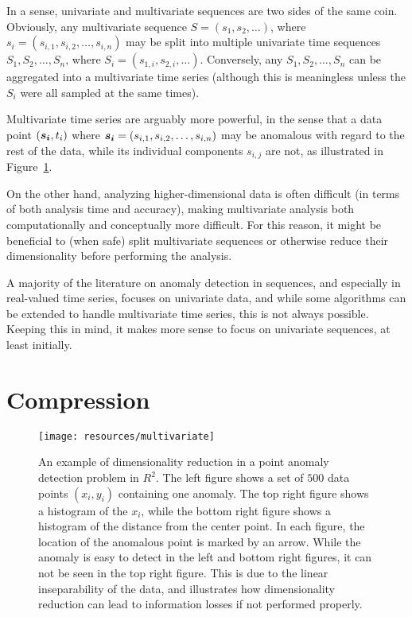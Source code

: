 In a sense, univariate and multivariate sequences are two sides of the same coin. Obviously, any multivariate sequence $S = (s_1, s_2, \dots)$, where $s_i = (s_{i,1}, s_{i,2}, \dots, s_{i,n})$ may be split into multiple univariate time sequences $S_1, S_2, \dots, S_n$, where $S_i = (s_{1,i}, s_{2, i}, \dots )$. Conversely, any $S_1, S_2, \dots, S_n$ can be aggregated into a multivariate time series (although this is meaningless unless the $S_i$ were all sampled at the same times).

Multivariate time series are arguably more powerful, in the sense that a data point $(\boldsymbol{s_i}, t_i)$ where $\boldsymbol{s_i} = (s_{i,1}, s_{i,2}, \dots, s_{i,n})$ may be anomalous with regard to the rest of the data, while its individual components $s_{i,j}$ are not, as illustrated in Figure~\ref{fig:dimensionality_reduction}.

On the other hand, analyzing higher-dimensional data is often difficult (in terms of both analysis time and accuracy), making multivariate analysis both computationally and conceptually more difficult. For this reason, it might be beneficial to (when safe) split multivariate sequences or otherwise reduce their dimensionality before performing the analysis.

A majority of the literature on anomaly detection in sequences, and especially in real-valued time series, focuses on univariate data, and while some algorithms can be extended to handle multivariate time series, this is not always possible. Keeping this in mind, it makes more sense to focus on univariate sequences, at least initially.

\section{Compression}
\label{sect:compression}

\begin{figure}[htb]
\begin{center}
\leavevmode
\texttt{[image: resources/multivariate]}
\end{center}
\caption{\small{An example of dimensionality reduction in a point anomaly detection problem in $R^2$. The left figure shows a set of $500$ data points $(x_i, y_i)$ containing one anomaly. The top right figure shows a histogram of the $x_i$, while the bottom right figure shows a histogram of the distance from the center point. In each figure, the location of the anomalous point is marked by an arrow. While the anomaly is easy to detect in the left and bottom right figures, it can not be seen in the top right figure. This is due to the linear inseparability of the data, and illustrates how dimensionality reduction can lead to information losses if not performed properly.}}
\label{fig:dimensionality_reduction}
\end{figure}

